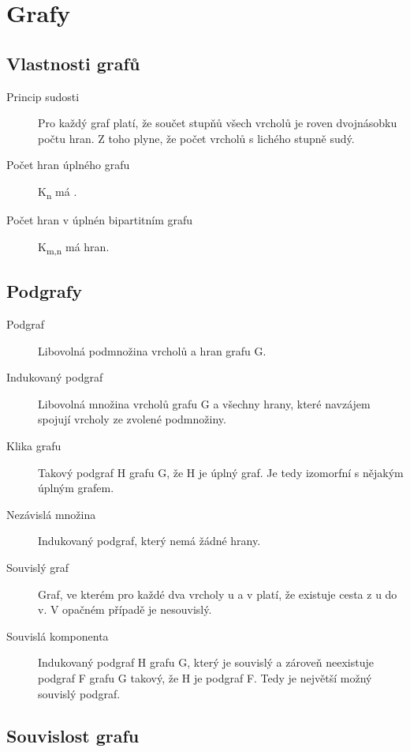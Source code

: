 \section{Grafy}

  \subsection{Vlastnosti grafů}
    \begin{description}
       \item[Princip sudosti] Pro každý graf platí, že součet stupňů všech vrcholů je roven dvojnásobku počtu hran. Z toho plyne, že počet vrcholů s lichého stupně sudý.
       \item[Počet hran úplného grafu] K\textsubscript{n} má .
       \item[Počet hran v úplnén bipartitním grafu] K\textsubscript{m,n} má  hran.
    \end{description}

  \subsection{Podgrafy}

    \begin{description}
      \item[Podgraf] Libovolná podmnožina vrcholů a hran grafu G.
      \item[Indukovaný podgraf] Libovolná množina vrcholů grafu G a všechny hrany, které navzájem spojují vrcholy ze zvolené podmnožiny.
      \item[Klika grafu] Takový podgraf H grafu G, že H je úplný graf. Je tedy izomorfní s nějakým úplným grafem.
      \item[Nezávislá množina] Indukovaný podgraf, který nemá žádné hrany.
      \item[Souvislý graf] Graf, ve kterém pro každé dva vrcholy u a v platí, že existuje cesta z u do v. V opačném případě je nesouvislý.
      \item[Souvislá komponenta] Indukovaný podgraf H grafu G, který je souvislý a zároveň neexistuje podgraf F grafu G takový, že H je podgraf F. Tedy je největší možný souvislý podgraf.
    \end{description}

  \subsection{Souvislost grafu}

